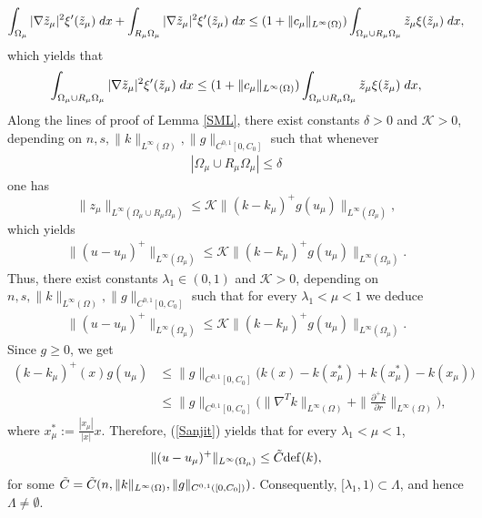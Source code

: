 \documentclass[11pt, notitlepage]{article}
\begin{document}
{{\begin{align}
    \int_{\Omega_\mu}|\nabla \Tilde{z}_\mu|^2\xi'(\Tilde{z}_\mu)\;dx+\int_{R_\mu\Omega_\mu}|\nabla \Tilde{z}_\mu|^2\xi'(\Tilde{z}_\mu)\;dx \leq (1+\|c_\mu\|_{L^\infty(\Omega)})\int_{\Omega_\mu\cup R_\mu\Omega_\mu}\Tilde{z}_\mu\xi(\Tilde{z}_\mu)\;dx, 
\end{align}
which yields that
\begin{align}
   \int_{\Omega_\mu\cup R_\mu\Omega_\mu}|\nabla \Tilde{z}_\mu|^2\xi'(\Tilde{z}_\mu)\;dx \leq (1+\|c_\mu\|_{L^\infty(\Omega)})\int_{\Omega_\mu\cup R_\mu\Omega_\mu}\Tilde{z}_\mu\xi(\Tilde{z}_\mu)\;dx,  
\end{align}
Along the lines of proof of Lemma \ref{SML}, there exist constants $\delta>0$ and $\mathcal{K}>0$, depending on $n,s,\|k\|_{L^\infty(\Omega)},\|g\|_{C^{0,1}[0,C_0]}$ such that whenever 
\begin{align}\label{MAA1}
    |\Omega_\mu\cup R_\mu\Omega_\mu|\leq \delta
\end{align}
one has
$$\|z_\mu\|_{L^\infty(\Omega_\mu\cup R_\mu\Omega_\mu)}\leq \mathcal{K}\|(k-k_\mu)^+g(u_\mu)\|_{L^\infty(\Omega_\mu)},$$
which yields
\begin{align}
      \|(u-u_\mu)^+\|_{L^\infty(\Omega_\mu)}\leq \mathcal{K}\|(k-k_\mu)^+g(u_\mu)\|_{L^\infty(\Omega_\mu)}.
\end{align}}
Thus, there exist constants $\lambda_1\in (0,1)$ and $\mathcal{K}>0$, depending on $n,s,\|k\|_{L^\infty(\Omega)},\|g\|_{C^{0,1}[0,C_0]}$ such that for every $\lambda_1<\mu<1$ we deduce
\begin{align}\label{Sanjit}
      \|(u-u_\mu)^+\|_{L^\infty(\Omega_\mu)}\leq \mathcal{K}\|(k-k_\mu)^+g(u_\mu)\|_{L^\infty(\Omega_\mu)}.
\end{align}
Since $g\geq 0$, we get
\begin{align*}
    (k-k_\mu)^+(x)g(u_\mu)&\leq \|g\|_{C^{0,1}[0,C_0]} \big(k(x)-k(x_\mu^*)+k(x_\mu^*)-k(x_\mu)\big)\\
    &\leq \|g\|_{C^{0,1}[0,C_0]}\big(\|\nabla^Tk\|_{L^\infty(\Omega)}+\|\frac{\partial^+k}{\partial r}\|_{L^\infty(\Omega)}\big),
\end{align*}
where $x_\mu^*:=\frac{|x_\mu|}{|x|}x$. Therefore, (\ref{Sanjit}) yields that for every $\lambda_1<\mu<1$,
\begin{align}\label{Sanjit0}
    \|(u-u_\mu)^+\|_{L^\infty(\Omega_\mu)}\leq \Tilde{C}\mathrm{def}(k),
\end{align}
for some $\Tilde{C}=\Tilde{C}(n,\|k\|_{L^\infty(\Omega)},\|g\|_{C^{0,1}([0,C_0])})$. Consequently, $[\lambda_1,1)\subset\Lambda$, and hence $\Lambda\neq \emptyset$.\\
}
\end{document}
